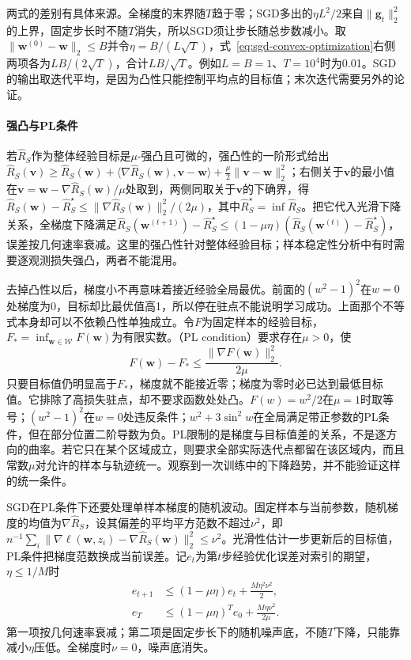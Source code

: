 两式的差别有具体来源。全梯度的末界随$T$趋于零；SGD多出的$\eta L^2/2$来自$\|\bm g_t\|_2^2$的上界，固定步长时不随$T$消失，所以SGD须让步长随总步数减小。取$\|\bm w^{(0)}-\bm w\|_2\leq B$并令$\eta=B/(L\sqrt T)$，式~\eqref{eq:sgd-convex-optimization}右侧两项各为$LB/(2\sqrt T)$，合计$LB/\sqrt T$。例如$L=B=1$、$T=10^4$时为0.01。SGD的输出取迭代平均，是因为凸性只能控制平均点的目标值；末次迭代需要另外的论证。

\paragraph{强凸与PL条件}

若$\hat R_S$作为整体经验目标是$\mu$-强凸且可微的，强凸性的一阶形式给出$\hat R_S(\bm v)\geq\hat R_S(\bm w)+\langle\nabla\hat R_S(\bm w),\bm v-\bm w\rangle+\frac\mu2\|\bm v-\bm w\|_2^2$；右侧关于$\bm v$的最小值在$\bm v=\bm w-\nabla\hat R_S(\bm w)/\mu$处取到，两侧同取关于$\bm v$的下确界，得$\hat R_S(\bm w)-\hat R_S^\star\leq\|\nabla\hat R_S(\bm w)\|_2^2/(2\mu)$，其中$\hat R_S^\star=\inf\hat R_S$。把它代入光滑下降关系，全梯度下降满足$\hat R_S(\bm w^{(t+1)})-\hat R_S^\star\leq(1-\mu\eta)(\hat R_S(\bm w^{(t)})-\hat R_S^\star)$，误差按几何速率衰减。这里的强凸性针对整体经验目标；样本稳定性分析中有时需要逐观测损失强凸，两者不能混用。

去掉凸性以后，梯度小不再意味着接近经验全局最优。前面的$(w^2-1)^2$在$w=0$处梯度为0，目标却比最优值高1，所以停在驻点不能说明学习成功。上面那个不等式本身却可以不依赖凸性单独成立。令$F$为固定样本的经验目标，$F_*=\inf_{\bm w\in\mathcal W}F(\bm w)$为有限实数。（PL condition）要求存在$\mu>0$，使
\[
 F(\bm w)-F_*\leq\frac{\|\nabla F(\bm w)\|_2^2}{2\mu}.
\]
只要目标值仍明显高于$F_*$，梯度就不能接近零；梯度为零时必已达到最低目标值。它排除了高损失驻点，却不要求函数处处凸。$F(w)=w^2/2$在$\mu=1$时取等号；$(w^2-1)^2$在$w=0$处违反条件；$w^2+3\sin^2w$在全局满足带正参数的PL条件，但在部分位置二阶导数为负。PL限制的是梯度与目标值差的关系，不是逐方向的曲率。若它只在某个区域成立，则要求全部实际迭代点都留在该区域内，而且常数$\mu$对允许的样本与轨迹统一。观察到一次训练中的下降趋势，并不能验证这样的统一条件。
\label{def:pl-condition}

SGD在PL条件下还要处理单样本梯度的随机波动。固定样本与当前参数，随机梯度的均值为$\nabla\hat R_S$，设其偏差的平均平方范数不超过$\nu^2$，即$n^{-1}\sum_i\|\nabla\ell(\bm w,z_i)-\nabla\hat R_S(\bm w)\|_2^2\leq\nu^2$。光滑性估计一步更新后的目标值，PL条件把梯度范数换成当前误差。记$e_t$为第$t$步经验优化误差对索引的期望，$\eta\leq1/M$时
\begin{equation}
 \begin{aligned}
 e_{t+1}&\leq(1-\mu\eta)e_t+\frac{M\eta^2\nu^2}{2},\\
 e_T&\leq(1-\mu\eta)^Te_0+\frac{M\eta\nu^2}{2\mu}.
 \end{aligned}
 \label{eq:pl-sgd-optimization}
\end{equation}
第一项按几何速率衰减；第二项是固定步长下的随机噪声底，不随$T$下降，只能靠减小$\eta$压低。全梯度时$\nu=0$，噪声底消失。

